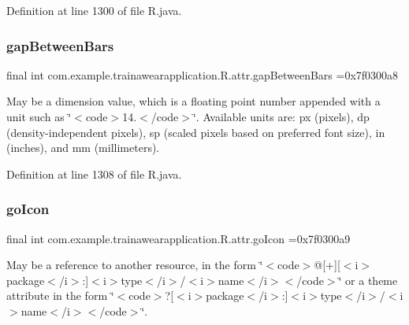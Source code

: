 Definition at line 1300 of file R.\+java.

\mbox{\label{classcom_1_1example_1_1trainawearapplication_1_1_r_1_1attr_aafd162e5b756ab44949d53df2bb3abd2}} 
\subsubsection{\texorpdfstring{gapBetweenBars}{gapBetweenBars}}
{\footnotesize\ttfamily final int com.\+example.\+trainawearapplication.\+R.\+attr.\+gap\+Between\+Bars =0x7f0300a8\hspace{0.3cm}{\ttfamily [static]}}

May be a dimension value, which is a floating point number appended with a unit such as \char`\"{}$<$code$>$14.\+5sp$<$/code$>$\char`\"{}. Available units are\+: px (pixels), dp (density-\/independent pixels), sp (scaled pixels based on preferred font size), in (inches), and mm (millimeters). 

Definition at line 1308 of file R.\+java.

\mbox{\label{classcom_1_1example_1_1trainawearapplication_1_1_r_1_1attr_a44659b913a423af987905f6c525e8314}} 
\subsubsection{\texorpdfstring{goIcon}{goIcon}}
{\footnotesize\ttfamily final int com.\+example.\+trainawearapplication.\+R.\+attr.\+go\+Icon =0x7f0300a9\hspace{0.3cm}{\ttfamily [static]}}

May be a reference to another resource, in the form \char`\"{}$<$code$>$@\mbox{[}+\mbox{]}\mbox{[}$<$i$>$package$<$/i$>$\+:\mbox{]}$<$i$>$type$<$/i$>$/$<$i$>$name$<$/i$>$$<$/code$>$\char`\"{} or a theme attribute in the form \char`\"{}$<$code$>$?\mbox{[}$<$i$>$package$<$/i$>$\+:\mbox{]}$<$i$>$type$<$/i$>$/$<$i$>$name$<$/i$>$$<$/code$>$\char`\"{}. 

